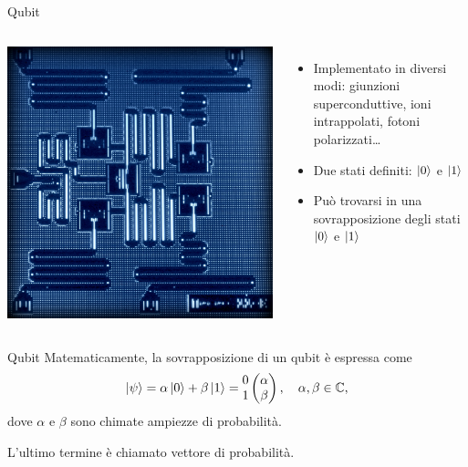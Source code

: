 \documentclass{beamer}
\begin{document}
    \begin{frame}{Qubit}
        \begin{columns}
            \includegraphics[width=\textwidth]{gfx/qubit}
            \begin{itemize}
                \item Implementato in diversi modi: giunzioni superconduttive, ioni intrappolati, fotoni polarizzati\ldots
                \item Due stati definiti: $\ket{0}$ e $\ket{1}$
                \item Può trovarsi in una sovrapposizione degli stati $\ket{0}$ e $\ket{1}$
            \end{itemize}
        \end{columns}
    \end{frame}

    \begin{frame}{Qubit}
        Matematicamente, la sovrapposizione di un qubit è espressa come
        \begin{equation*}
            \ket{\psi} = \alpha \ket{0} + \beta \ket{1} = \begin{matrix}
                0 \\ 1
            \end{matrix}\begin{pmatrix}
                \alpha \\ \beta
            \end{pmatrix}
            , \quad \alpha, \beta \in \mathbb{C}, 
        \end{equation*}
        dove $\alpha$ e $\beta$ sono chimate ampiezze di probabilità. 
        
        L'ultimo termine è chiamato vettore di probabilità. 
    \end{frame}
\end{document}
